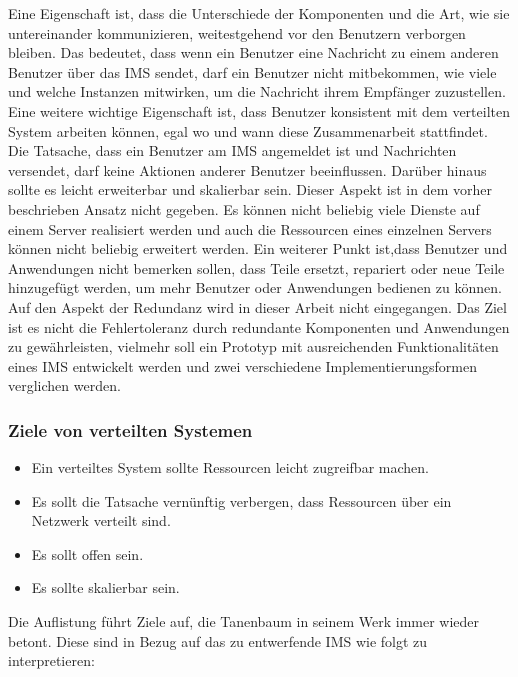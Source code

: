 \documentclass[a4paper,titlepage,halfparskip,12pt]{scrreprt}
\begin{document}
\begin{onehalfspacing}
Eine Eigenschaft ist, dass die Unterschiede der Komponenten und die Art, wie sie untereinander kommunizieren, weitestgehend vor den Benutzern verborgen bleiben. Das bedeutet, dass wenn ein Benutzer eine Nachricht zu einem anderen Benutzer über das \ac{IMS} sendet, darf ein Benutzer nicht mitbekommen, wie viele und welche Instanzen mitwirken, um die Nachricht ihrem Empfänger zuzustellen. Eine weitere wichtige Eigenschaft ist, dass Benutzer konsistent mit dem verteilten System arbeiten können, egal wo und wann diese Zusammenarbeit stattfindet. Die Tatsache, dass ein Benutzer am \ac{IMS} angemeldet ist und Nachrichten versendet, darf keine Aktionen anderer Benutzer beeinflussen. Darüber hinaus sollte es leicht erweiterbar und skalierbar sein. Dieser Aspekt ist in dem vorher beschrieben Ansatz nicht gegeben. Es können nicht beliebig viele Dienste auf einem Server realisiert werden und auch die Ressourcen eines einzelnen Servers können nicht beliebig erweitert werden. Ein weiterer Punkt ist,dass Benutzer und Anwendungen nicht bemerken sollen, dass Teile ersetzt, repariert oder neue Teile hinzugefügt werden, um mehr Benutzer oder Anwendungen bedienen zu können.\cite{andrew2008verteilte}
Auf den Aspekt der Redundanz wird in dieser Arbeit nicht eingegangen. Das Ziel ist es nicht die Fehlertoleranz durch redundante Komponenten und Anwendungen zu gewährleisten, vielmehr soll ein Prototyp mit ausreichenden Funktionalitäten eines \ac{IMS} entwickelt werden und zwei verschiedene Implementierungsformen verglichen werden.

\subsubsection*{Ziele von verteilten Systemen \cite{andrew2008verteilte}}

\begin{itemize}
\item Ein verteiltes System sollte Ressourcen leicht zugreifbar machen.
\item Es sollt die Tatsache vernünftig verbergen, dass Ressourcen über ein Netzwerk verteilt sind.
\item Es sollt offen sein.
\item Es sollte skalierbar sein.
\end{itemize}

Die Auflistung führt Ziele auf, die Tanenbaum \cite{andrew2008verteilte} in seinem Werk immer wieder betont. Diese sind in Bezug auf das zu entwerfende \ac{IMS} wie folgt zu interpretieren:


\end{onehalfspacing}
\end{document}
